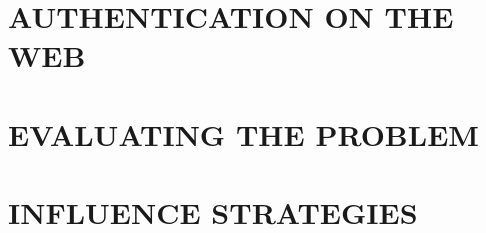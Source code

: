 \documentclass[12pt,a4paper]{book}
\begin{document}
\frontmatter
\tableofcontents


\mainmatter



\part{AUTHENTICATION ON THE WEB}
\label{part:related_work}

%
%










%

%


\part{EVALUATING THE PROBLEM}
%



\part{INFLUENCE STRATEGIES}


% 
\end{document}
